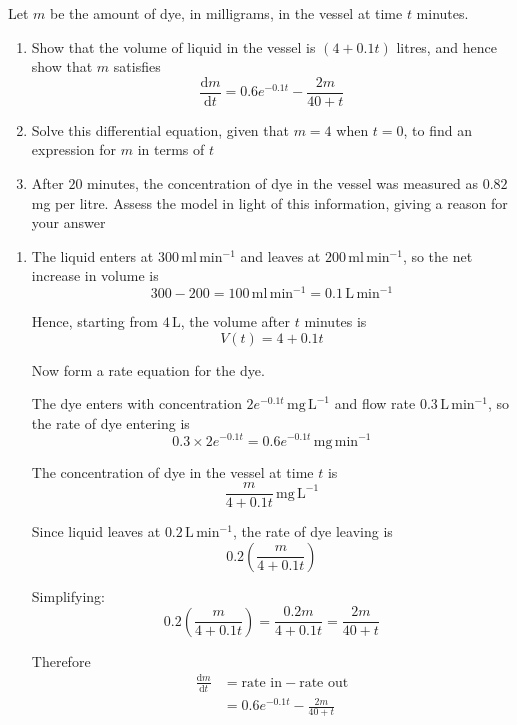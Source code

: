 \documentclass[leqno]{article}
\begin{document}
\begin{enumerate}[
  label=\textbf{\arabic*.},
  leftmargin=*,
  topsep=0pt,
  partopsep=0pt,
  parsep=0pt
]
Let $m$ be the amount of dye, in milligrams, in the vessel at time $t$ minutes. \\

\begin{enumerate}[label=\textbf{(\alph*)}]
  \item Show that the volume of liquid in the vessel is $(4+0.1t)$ litres, and hence show that $m$ satisfies
  \[
  \frac{\mathrm{d}m}{\mathrm{d}t}=0.6e^{-0.1t}-\frac{2m}{40+t}
  \] 
  \item Solve this differential equation, given that $m=4$ when $t=0$, to find an expression for $m$ in terms of $t$  \\
  \item After $20$ minutes, the concentration of dye in the vessel was measured as $0.82$ mg per litre. Assess the model in light of this information, giving a reason for your answer  \\
\end{enumerate}

\vspace*{10pt}

\begin{djsSolution}
\begin{enumerate}[label=\textbf{(\alph*)}]
  \item The liquid enters at \(300\,\mathrm{ml\,min^{-1}}\) and leaves at \(200\,\mathrm{ml\,min^{-1}}\), so the net increase in volume is
\[
300-200=100\,\mathrm{ml\,min^{-1}}=0.1\,\mathrm{L\,min^{-1}}
\]

Hence, starting from \(4\,\mathrm{L}\), the volume after \(t\) minutes is
\[
V(t)=4+0.1t
\]

Now form a rate equation for the dye.

The dye enters with concentration \(2e^{-0.1t}\,\mathrm{mg\,L^{-1}}\) and flow rate \(0.3\,\mathrm{L\,min^{-1}}\), so the rate of dye entering is
\[
0.3 \times 2e^{-0.1t}=0.6e^{-0.1t}\,\mathrm{mg\,min^{-1}}
\]

The concentration of dye in the vessel at time \(t\) is
\[
\frac{m}{4+0.1t}\,\mathrm{mg\,L^{-1}}
\]

Since liquid leaves at \(0.2\,\mathrm{L\,min^{-1}}\), the rate of dye leaving is
\[
0.2\left(\frac{m}{4+0.1t}\right)
\]

Simplifying:
\[
0.2\left(\frac{m}{4+0.1t}\right)=\frac{0.2m}{4+0.1t}=\frac{2m}{40+t}
\]

Therefore
\begin{align*}
\frac{\mathrm{d}m}{\mathrm{d}t}
&=\text{rate in}-\text{rate out} \\
&=0.6e^{-0.1t}-\frac{2m}{40+t}
\end{align*}


\end{enumerate}
\end{djsSolution}
\end{enumerate}
\end{document}
